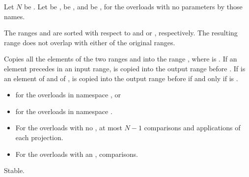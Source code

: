 \begin{itemdescr}
\pnum
Let $N$ be .
Let  be ,
 be , and
 be ,
for the overloads with no parameters by those names.

\pnum
\expects
The ranges  and 
are sorted with respect to  and  or ,
respectively.
The resulting range does not overlap with either of the original ranges.

\pnum
\effects
Copies all the elements of the two ranges  and
 into the range ,
where  is .
If an element  precedes  in an input range,
 is copied into the output range before .
If  is an element of  and
 of ,
 is copied into the output range before  if and only if
is .

\pnum
\returns
\begin{itemize}
\item
  for the overloads in namespace , or
\item
  for the overloads in namespace .
\end{itemize}

\pnum
\complexity
\begin{itemize}
\item
  For the overloads with no ,
  at most $N - 1$ comparisons and applications of each projection.
\item
  For the overloads with an ,  comparisons.
\end{itemize}

\pnum
\remarks
Stable.
\end{itemdescr}

